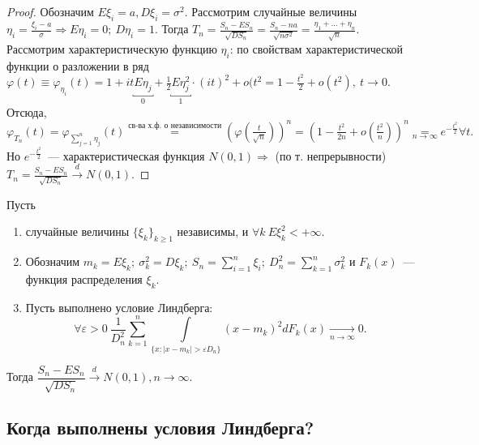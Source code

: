 	\begin{proof}
		Обозначим \(E\xi_i = a, D\xi_i = \sigma^2.\)
		Рассмотрим случайные величины \(\eta_i = \frac{\xi_i - a}{\sigma} \Rightarrow 
		E\eta_i = 0; ~ D\eta_i = 1.\)
		Тогда \(T_n = \frac{S_n - ES_n}{\sqrt{DS_n}} = \frac{S_n - na}{\sqrt{n\sigma^2}} = \frac{\eta_1 + \ldots + \eta_n}{\sqrt{n}}.\)
		Рассмотрим характеристическую функцию \(\eta_i\): по свойствам характеристической функции о разложении в ряд \(\varphi(t) \equiv \varphi_{\eta_i}(t) = 1 + it\underbracket{E\eta_j}_{0} + \frac{1}{2}\underbracket{E\eta_j^2}_1\cdot(it)^2 + o(t^2 = 1 - \frac{t^2}{2} + o(t^2), ~ t \to 0.\) Отсюда, \(\varphi_{T_n}(t) = \varphi_{\sum\limits_{j = 1}^{n}\eta_j}(t) \overset{\text{св-ва х.ф. о независимости}}{=} \left(\varphi\left(\frac{t}{\sqrt{n}}\right)\right)^n = \left(1 - \frac{t^2}{2n} + o\left(\frac{t^2}{n}\right)\right)^n \underset{n \to \infty}{=} e^{- \frac{t^2}{2}} \forall t. \)Но \(e^{-\frac{t^2}{2}}\)~--- характеристическая функция \(N(0,1) \Rightarrow\) (по т. непрерывности) \(T_n = \frac{S_n - ES_n}{\sqrt{DS_n}} \overset{d}{\longrightarrow} N(0,1).\)
	\end{proof}
	
	\begin{theorem}[Линдберга][б/д]
		Пусть 
		\begin{enumerate}
		    \item случайные величины \(\{\xi_k\}_{k \geqslant 1}\) независимы, и \(\forall k~ E\xi_k^2 < +\infty\).
		    \item Обозначим \(m_k = E\xi_k; ~\sigma^2_k = D\xi_k; ~S_n = \sum\limits_{i = 1}^{n}\xi_i; ~D_n^2 = \sum\limits_{k = 1}^{n}\sigma^2_k\) и \(F_k(x)\)~--- функция распределения \(\xi_k\).
		    \item Пусть выполнено условие Линдберга:
    		\[
    			\forall \varepsilon > 0 ~ \frac{1}{D^2_n} \sum\limits_{k = 1}^{n} \int\limits_{\{x:|x - m_k| > \varepsilon D_n\}}(x-m_k)^2 dF_k(x) \underset{n \to \infty}{\longrightarrow} 0.
    		\]
		\end{enumerate} 
		
		Тогда \( \dfrac{S_n - ES_n}{\sqrt{DS_n}} \overset{d}{\longrightarrow} N(0,1), n\to \infty\).
	\end{theorem}

	\subsection{Когда выполнены условия Линдберга?}

